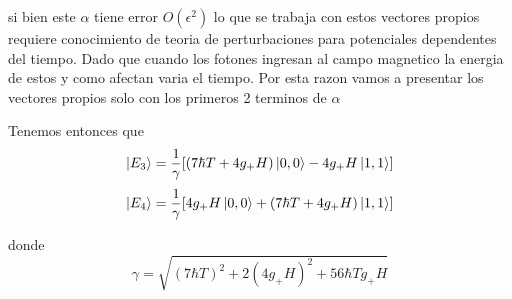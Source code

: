 \documentclass[twocolumn,
amssymb,prb,aps,superscriptaddress]{revtex4}
\begin{document}
     si bien este $\alpha$ tiene error $O(\epsilon^2)$ lo que se trabaja con estos vectores propios requiere conocimiento de teoria de perturbaciones para potenciales dependentes del tiempo. Dado que cuando los fotones ingresan al campo magnetico la energia de estos y como afectan varia el tiempo. Por esta razon vamos a presentar los vectores propios solo con los primeros 2 terminos de $\alpha$

    Tenemos entonces que 
    \begin{equation}
        \ket{E_3} = \frac{1}{\gamma} [(7 \hbar T + 4 g_+ H) \ket{0,0} - 4 g_+ H \ket{1,1}]
    \end{equation}
    \begin{equation}
        \ket{E_4} = \frac{1}{\gamma}  [4 g_+ H \ket{0,0} + (7 \hbar T + 4 g_+ H) \ket{1,1}]
    \end{equation}

    donde 
    \begin{equation*}
        \gamma = \sqrt{(7 \hbar T)^2 + 2 (4 g_+ H)^2 + 56 \hbar T g_+ H}
    \end{equation*}
    
\end{document}
